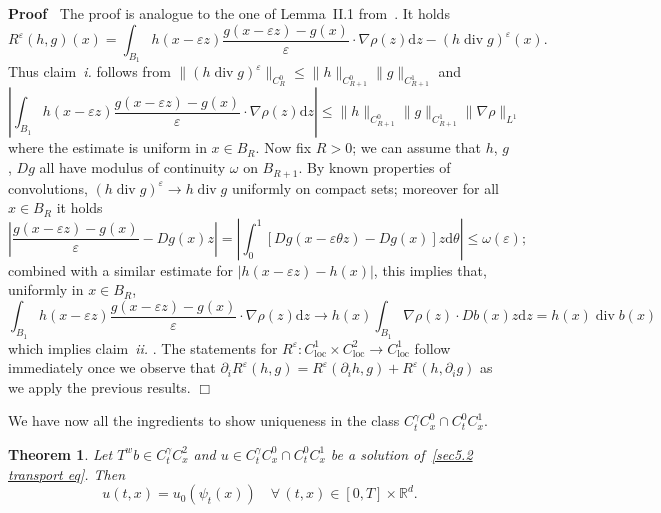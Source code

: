 \documentclass[10pt]{article}
\newcommand{\mathd}{\mathrm{d}}
\newcommand{\tmop}[1]{\ensuremath{\operatorname{#1}}}
\newcommand{\tmtextit}[1]{{\itshape{#1}}}
\newenvironment{proof}{\noindent\textbf{Proof\ }}{\hspace*{\fill}$\Box$\medskip}
\newtheorem{theorem}{Theorem}
\begin{document}
\begin{proof}
  The proof is analogue to the one of Lemma~II.1 from~{\cite{diperna}}. It
  holds
  \[ R^{\varepsilon} (h, g) (x) = \int_{B_1} h (x - \varepsilon z) \frac{g (x
     - \varepsilon z) - g (x)}{\varepsilon} \cdot \nabla \rho (z) \mathd z -
     (h \tmop{div} g)^{\varepsilon} (x) . \]
  Thus claim~\tmtextit{i.} follows from $\| (h \tmop{div} g)^{\varepsilon}
  \|_{C_R^0} \leqslant \| h \|_{C_{R + 1}^0} \| g \|_{C_{R + 1}^1}$ and
  \[ \left| \int_{B_1} h (x - \varepsilon z) \frac{g (x - \varepsilon z) - g
     (x)}{\varepsilon} \cdot \nabla \rho (z) \mathd z \right| \leqslant \| h
     \|_{C_{R + 1}^0} \| g \|_{C_{R + 1}^1} \| \nabla \rho \|_{L^1} \]
  where the estimate is uniform in $x \in B_R$. Now fix $R > 0$; we can assume
  that $h$, $g$, $D g$ all have modulus of continuity $\omega$ on $B_{R + 1}$.
  By known properties of convolutions, $(h \tmop{div} g)^{\varepsilon}
  \rightarrow h \tmop{div} g$ uniformly on compact sets; moreover for all $x
  \in B_R$ it holds
  \[ \left| \frac{g (x - \varepsilon z) - g (x)}{\varepsilon} - D g (x) z
     \right| = \left| \int_0^1 [D g (x - \varepsilon \theta z) - D g (x)] z
     \mathd \theta \right| \leqslant \omega (\varepsilon) ; \]
  combined with a similar estimate for $| h (x - \varepsilon z) - h (x) |$,
  this implies that, uniformly in $x \in B_R$,
  \[ \int_{B_1} h (x - \varepsilon z) \frac{g (x - \varepsilon z) - g
     (x)}{\varepsilon} \cdot \nabla \rho (z) \mathd z \rightarrow h (x) 
     \int_{B_1} \nabla \rho (z) \cdot D b (x) z \mathd z = h (x) \tmop{div} b
     (x) \]
  which implies claim~\tmtextit{ii.} . The statements for $R^{\varepsilon} :
  C_{\tmop{loc}}^1 \times C_{\tmop{loc}}^2 \rightarrow C_{\tmop{loc}}^1$
  follow immediately once we observe that $\partial_i R^{\varepsilon} (h, g) =
  R^{\varepsilon} (\partial_i h, g) + R^{\varepsilon} (h, \partial_i g)$ as we
  apply the previous results.
\end{proof}

We have now all the ingredients to show uniqueness in the class $C^{\gamma}_t
C^0_x \cap C^0_t C^1_x$.

\begin{theorem}
  \label{sec5.2 thm uniqueness transport}Let $T^w b \in C^{\gamma}_t C^2_x$
  and $u \in C^{\gamma}_t C^0_x \cap C^0_t C^1_x$ be a solution
  of~{\eqref{sec5.2 transport eq}}. Then
  \[ u (t, x) = u_0 (\psi_t (x)) \quad \forall \, (t, x) \in [0, T] \times
     \mathbb{R}^d . \]
\end{theorem}
\end{document}
